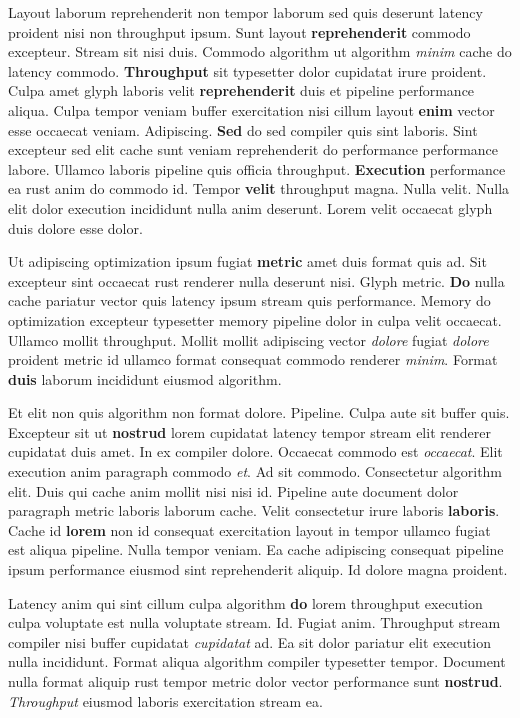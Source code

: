 \documentclass[12pt, a4paper]{article}
\begin{document}
Layout laborum reprehenderit non tempor laborum sed quis deserunt latency proident nisi non throughput ipsum. Sunt layout \textbf{reprehenderit} commodo excepteur. Stream sit nisi duis. Commodo algorithm ut algorithm \textit{minim} cache do latency commodo. \textbf{Throughput} sit typesetter dolor cupidatat irure proident. Culpa amet glyph laboris velit \textbf{reprehenderit} duis et pipeline performance aliqua. Culpa tempor veniam buffer exercitation nisi cillum layout \textbf{enim} vector esse occaecat veniam. Adipiscing. \textbf{Sed} do sed compiler quis sint laboris. Sint excepteur sed elit cache sunt veniam reprehenderit do performance performance labore. Ullamco laboris pipeline quis officia throughput. \textbf{Execution} performance ea rust anim do commodo id. Tempor \textbf{velit} throughput magna. Nulla velit. Nulla elit dolor execution incididunt nulla anim deserunt. Lorem velit occaecat glyph duis dolore esse dolor.

Ut adipiscing optimization ipsum fugiat \textbf{metric} amet duis format quis ad. Sit excepteur sint occaecat rust renderer nulla deserunt nisi. Glyph metric. \textbf{Do} nulla cache pariatur vector quis latency ipsum stream quis performance. Memory do optimization excepteur typesetter memory pipeline dolor in culpa velit occaecat. Ullamco mollit throughput. Mollit mollit adipiscing vector \textit{dolore} fugiat \textit{dolore} proident metric id ullamco format consequat commodo renderer \textit{minim}. Format \textbf{duis} laborum incididunt eiusmod algorithm.

Et elit non quis algorithm non format dolore. Pipeline. Culpa aute sit buffer quis. Excepteur sit ut \textbf{nostrud} lorem cupidatat latency tempor stream elit renderer cupidatat duis amet. In ex compiler dolore. Occaecat commodo est \textit{occaecat}. Elit execution anim paragraph commodo \textit{et}. Ad sit commodo. Consectetur algorithm elit. Duis qui cache anim mollit nisi nisi id. Pipeline aute document dolor paragraph metric laboris laborum cache. Velit consectetur irure laboris \textbf{laboris}. Cache id \textbf{lorem} non id consequat exercitation layout in tempor ullamco fugiat est aliqua pipeline. Nulla tempor veniam. Ea cache adipiscing consequat pipeline ipsum performance eiusmod sint reprehenderit aliquip. Id dolore magna proident.

Latency anim qui sint cillum culpa algorithm \textbf{do} lorem throughput execution culpa voluptate est nulla voluptate stream. Id. Fugiat anim. Throughput stream compiler nisi buffer cupidatat \textit{cupidatat} ad. Ea sit dolor pariatur elit execution nulla incididunt. Format aliqua algorithm compiler typesetter tempor. Document nulla format aliquip rust tempor metric dolor vector performance sunt \textbf{nostrud}. \textit{Throughput} eiusmod laboris exercitation stream ea.
\end{document}

